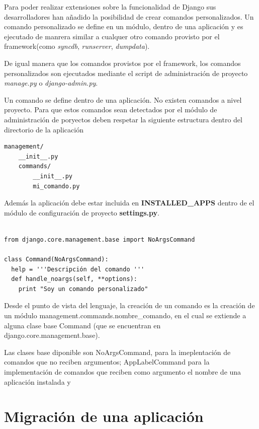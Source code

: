 \documentclass[a4paper]{report}
\begin{document}
Para poder realizar extensiones sobre la funcionalidad de Django sus
desarrolladores han añadido la posibilidad de crear comandos
personalizados. Un comando personalizado se define en un módulo, dentro
de una aplicación y es ejecutado de manrera similar a cualquer 
otro comando provisto por el framework(como 
\emph{syncdb}, \emph{runserver}, \emph{dumpdata}).

De igual manera que los comandos provistos por el framework, los comandos
personalizados son ejecutados mediante el script de administración
de proyecto \emph{manage.py} o \emph{django-admin.py}.

Un comando se define dentro de una aplicación. No existen comandos a nivel
proyecto. Para que estos comandos sean detectados por el módulo de
administración de poryectos deben  respetar la siguiente estructura dentro del
directorio de la aplicación 
\begin{verbatim}
management/
    __init__.py
    commands/
        __init__.py
        mi_comando.py
\end{verbatim}

Además la aplicación debe estar incluida en \textbf{INSTALLED\_APPS}
dentro de el módulo de configuración de proyecto \textbf{settings.py}.

\begin{lstlisting}[style=python,
		   label=basic-django-command,
		   caption=Comando personalizado básico en Django]

from django.core.management.base import NoArgsCommand

class Command(NoArgsCommand):
  help = '''Descripción del comando '''
  def handle_noargs(self, **options):
    print "Soy un comando personalizado"

\end{lstlisting}

Desde el punto de vista del lenguaje, la creación de un comando es la creación
de un módulo management.commands.nombre\_comando, en el cual se extiende 
a alguna clase base Command (que se encuentran en django.core.management.base).

Las clases base diponible son NoArgsCommand, para la imeplentación de comandos
que no reciben argumentos; AppLabelCommand para la implementación de comandos
que reciben como argumento el nombre de una aplicación instalada y 

\section{Migración de una aplicación}
\end{document}
